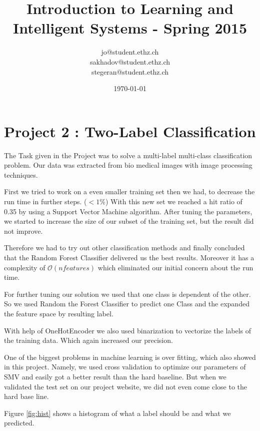 \documentclass[a4paper, 11pt]{article}
\title{Introduction to Learning and Intelligent Systems - Spring 2015}
\author{jo@student.ethz.ch\\ sakhadov@student.ethz.ch\\  stegeran@student.ethz.ch\\}
\date{\today}
\begin{document}
\maketitle

\section*{Project 2 : Two-Label Classification}

The Task given in the Project was to solve a multi-label multi-class classification problem. Our data was extracted from bio medical images with image processing techniques.

First we tried to work on a even smaller training set then we had, to decrease the run time in further steps. ($<1$\%) With this new set we reached a hit ratio of 0.35 by using a Support Vector Machine algorithm. After tuning the parameters, we started to increase the size of our subset of the training set, but the result did not improve.

Therefore we had to try out other classification methods and finally concluded that the Random Forest Classifier delivered us the best results. Moreover it has a complexity of $\mathcal{O}(nfeatures)$ which eliminated our initial concern about the run time.

For further tuning our solution we used that one class is dependent of the other. So we used Random the Forest Classifier to predict one Class and the expanded the feature space by resulting label. 

With help of OneHotEncoder we also used binarization to vectorize the labels of the training data. Which again increased our precision.

One of the biggest problems in machine learning is over fitting, which also showed in this project. Namely, we used cross validation to optimize our parameters of SMV and easily got a better result than the hard baseline. But when we validated the test set on our project website, we did not even come close to the hard base line.

Figure \ref{fig:hist} shows a histogram of what a label should be and what we predicted.
\end{document}
